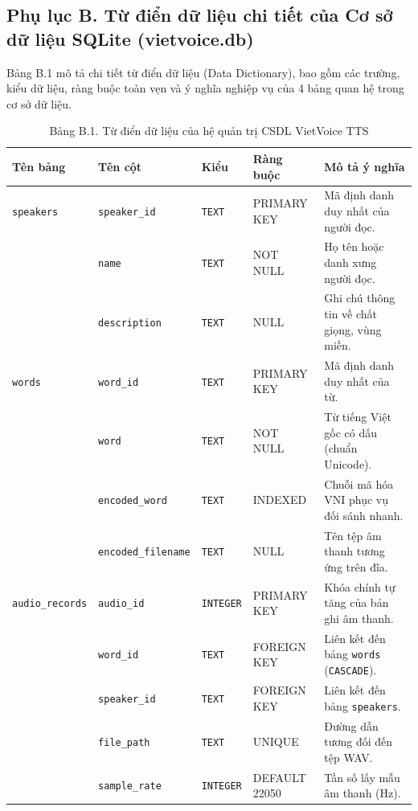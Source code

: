 \subsection*{Phụ lục B. Từ điển dữ liệu chi tiết của Cơ sở dữ liệu SQLite (vietvoice.db)}
\label{app:data_dictionary}

Bảng B.1 mô tả chi tiết từ điển dữ liệu (Data Dictionary), bao gồm các trường, kiểu dữ liệu, ràng buộc toàn vẹn và ý nghĩa nghiệp vụ của 4 bảng quan hệ trong cơ sở dữ liệu.

\begin{table}[H]
\centering
\caption*{Bảng B.1. Từ điển dữ liệu của hệ quản trị CSDL VietVoice TTS}
\vspace{2pt}
\begin{tabularx}{\textwidth}{p{2.4cm}p{3.2cm}p{1.4cm}p{2.4cm}X}
\toprule
\textbf{Tên bảng} & \textbf{Tên cột} & \textbf{Kiểu} & \textbf{Ràng buộc} & \textbf{Mô tả ý nghĩa} \\
\midrule
\texttt{speakers} & \texttt{speaker\_id} & \texttt{TEXT} & PRIMARY KEY & Mã định danh duy nhất của người đọc. \\
& \texttt{name} & \texttt{TEXT} & NOT NULL & Họ tên hoặc danh xưng người đọc. \\
& \texttt{description} & \texttt{TEXT} & NULL & Ghi chú thông tin về chất giọng, vùng miền. \\
\midrule
\texttt{words} & \texttt{word\_id} & \texttt{TEXT} & PRIMARY KEY & Mã định danh duy nhất của từ. \\
& \texttt{word} & \texttt{TEXT} & NOT NULL & Từ tiếng Việt gốc có dấu (chuẩn Unicode). \\
& \texttt{encoded\_word} & \texttt{TEXT} & INDEXED & Chuỗi mã hóa VNI phục vụ đối sánh nhanh. \\
& \texttt{encoded\_filename} & \texttt{TEXT} & NULL & Tên tệp âm thanh tương ứng trên đĩa. \\
\midrule
\texttt{audio\_records} & \texttt{audio\_id} & \texttt{INTEGER} & PRIMARY KEY & Khóa chính tự tăng của bản ghi âm thanh. \\
& \texttt{word\_id} & \texttt{TEXT} & FOREIGN KEY & Liên kết đến bảng \texttt{words} (\texttt{CASCADE}). \\
& \texttt{speaker\_id} & \texttt{TEXT} & FOREIGN KEY & Liên kết đến bảng \texttt{speakers}. \\
& \texttt{file\_path} & \texttt{TEXT} & UNIQUE & Đường dẫn tương đối đến tệp WAV. \\
& \texttt{sample\_rate} & \texttt{INTEGER} & DEFAULT 22050 & Tần số lấy mẫu âm thanh (Hz). \\

\end{tabularx}
\end{table}
